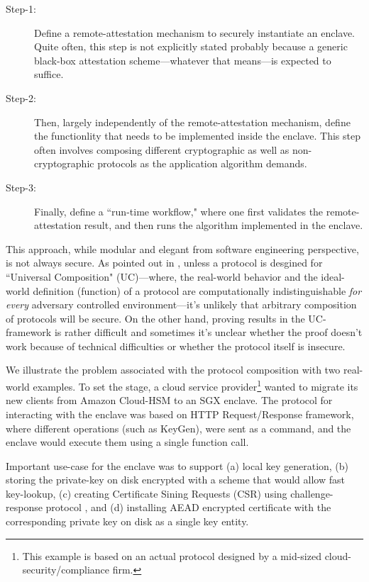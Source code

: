 \documentclass[10pt]{article}
\newcommand{\uc}{\textsf{UC}}
\begin{document}
  \begin{description}
    \item[Step-1:] Define a remote-attestation mechanism to securely 
      instantiate an enclave. Quite often, this step is not explicitly 
      stated probably because a generic black-box attestation 
      scheme---whatever that means---is expected to suffice.
    \item[Step-2:] Then, largely independently of the remote-attestation 
      mechanism, define the functionlity that needs to be implemented 
      inside the enclave. This step often involves composing different 
      cryptographic as well as non-cryptographic protocols as the 
      application algorithm demands.
    \item[Step-3:] Finally, define a ``run-time workflow," where one first
      validates the remote-attestation result, and then runs the algorithm
      implemented in the enclave.
  \end{description}

  This approach, while modular and elegant from software engineering
  perspective, is not always secure. As pointed out in 
  \cite{ucframework}, unless a protocol is desgined for 
  ``\textsf{Universal Composition}" (\uc)---where, the real-world 
  behavior and the ideal-world definition (function) of a protocol 
  are computationally indistinguishable \textit{for every} adversary 
  controlled environment---it's unlikely that arbitrary composition 
  of protocols will be secure. On the other hand, proving results in 
  the \uc-framework is rather difficult and sometimes it's unclear 
  whether the proof doesn't work because of technical difficulties 
  or whether the protocol itself is insecure.

  We illustrate the problem associated with the protocol composition 
  with two real-world examples. To set the stage, a cloud service 
  provider\footnote{This example is based on an actual protocol 
  designed by a mid-sized cloud-security/compliance firm.} wanted to 
  migrate its new clients from Amazon Cloud-HSM to an SGX enclave. 
  The protocol for interacting with the enclave was based on 
  HTTP Request/Response framework, where different operations (such as
  \textsf{KeyGen}), were sent as a command, and the enclave would execute
  them using a single function call.

  Important use-case for the enclave was to support (a) local key 
  generation, (b) storing the private-key on disk encrypted with a 
  scheme that would allow fast key-lookup, (c) creating Certificate 
  Sining Requests (CSR) using challenge-response protocol 
  \cite[\S5.2.8.3]{rfc4210}, and (d) installing AEAD encrypted 
  certificate with the corresponding private key on disk as a single
  key entity.
\end{document}
